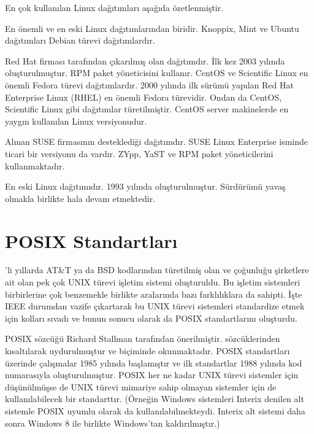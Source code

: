 \documentclass[a4paper,10pt,turkish]{sphinxmanual}
\begin{document}
\sphinxAtStartPar
En çok kullanılan Linux dağıtımları aşağıda özetlenmiştir.

\sphinxAtStartPar
{} En önemli ve en eski Linux dağıtımlarından biridir. Knoppix, Mint ve Ubuntu
dağıtımları Debian türevi dağıtımlardır.

\sphinxAtStartPar
{} Red Hat firması tarafından çıkarılmış olan dağıtımdır. İlk kez 2003 yılında
oluşturulmuştur. RPM paket yöneticisini kullanır. CentOS ve Scientific Linux en önemli
Fedora türevi dağıtımlardır. 2000 yılında ilk sürümü yapılan Red Hat Enterprise Linux
(RHEL) en önemli Fedora türevidir. Ondan da CentOS, Scientific Linux gibi dağıtımlar
türetilmiştir. CentOS server makinelerde en yaygın kullanılan Linux versiyonudur.

\sphinxAtStartPar
{} Alman SUSE firmasının desteklediği dağıtımdır. SUSE Linux Enterprise isminde
ticari bir versiyonu da vardır. ZYpp, YaST ve RPM paket yöneticilerini kullanmaktadır.

\sphinxAtStartPar
{} En eski Linux dağıtımıdır. 1993 yılında oluşturulmuştur. Sürdürümü yavaş
olmakla birlikte hala devam etmektedir.


\section{POSIX Standartları}
\label{\detokenize{introduction:posix-standartlari}}
’li yıllarda AT\&T ya da BSD kodlarından türetilmiş olan ve çoğunluğu şirketlere ait
olan pek çok UNIX türevi işletim sistemi oluşturuldu. Bu işletim sistemleri birbirlerine
çok benzemekle birlikte aralarında bazı farklılıklara da sahipti. İşte IEEE durumdan vazife
çıkartarak bu UNIX türevi sistemleri standardize etmek için kolları sıvadı ve bunun sonucu
olarak da POSIX standartlarını oluşturdu.

\sphinxAtStartPar
POSIX sözcüğü Richard Stallman tarafından önerilmiştir.  sözcüklerinden kısaltılarak uydurulmuştur ve  biçiminde okunmaktadır.
POSIX standartları üzerinde çalışmalar 1985 yılında başlamıştır ve ilk standartlar 1988
yılında  kod numarasıyla oluşturulmuştur. POSIX her ne kadar UNIX
türevi sistemler için düşünülmüşse de UNIX türevi mimariye sahip olmayan sistemler için de
kullanılabilecek bir standarttır. (Örneğin Windows sistemleri Interix denilen alt sistemle
POSIX uyumlu olarak da kullanılabilmekteydi. Interix alt sistemi daha sonra Windows 8 ile
birlikte Windows’tan kaldırılmıştır.)
\end{document}
